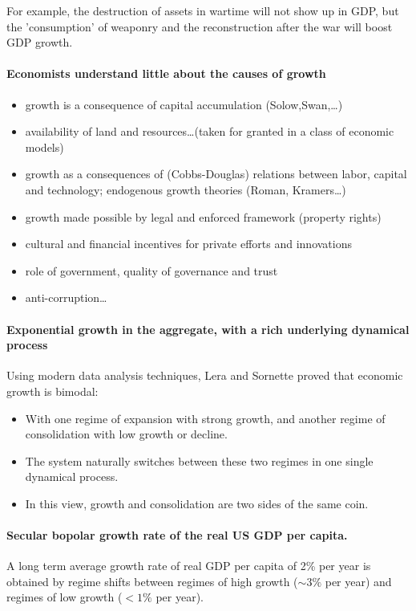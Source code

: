 For example, the destruction of assets in wartime will not show up in GDP,
but the 'consumption' of weaponry and the reconstruction after the war will
boost GDP growth.

\paragraph{Economists understand little about the causes of growth}

\begin{itemize}
    \item growth is a consequence of capital accumulation (Solow,Swan,\dots)
    \item availability of land and resources\dots (taken for granted in a class
        of economic models)
    \item growth as a consequences of (Cobbs-Douglas) relations between labor,
        capital and technology; endogenous growth theories (Roman, Kramers\dots)
    \item growth made possible by legal and enforced framework (property rights)
    \item cultural and financial incentives for private efforts and innovations
    \item role of government, quality of governance and trust
    \item anti-corruption\dots
\end{itemize}

\paragraph{Exponential growth in the aggregate, with a rich underlying
dynamical process}

Using modern data analysis techniques, Lera and Sornette proved that economic
growth is bimodal:
\begin{itemize}
    \item With one regime of expansion with strong growth, and another regime
        of consolidation with low growth or decline.
    \item The system naturally switches between these two regimes in one single
        dynamical process.
    \item In this view, growth and consolidation are two sides of the same coin.
\end{itemize}

\paragraph{Secular bopolar growth rate of the real US GDP per capita.}
A long term average growth rate of real GDP per capita of 2\% per year is
obtained by regime shifts between regimes of high growth ($\sim 3\%$ per year)
and regimes of low growth ($<1\%$ per year).

